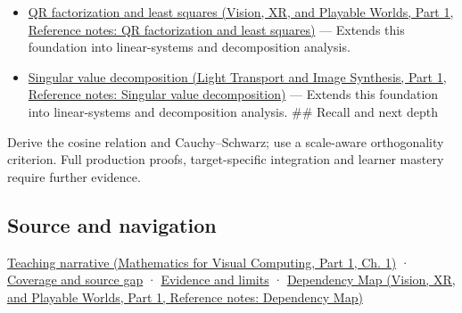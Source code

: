\begin{itemize}
\item
  \href{../07-Vision-XR-and-Playable-Worlds-P01/main.pdf\#nameddest=appendix-c3421e6b4f2c}{QR factorization and least squares (Vision, XR, and Playable Worlds, Part 1, Reference notes: QR factorization and least squares)} --- Extends this foundation into linear-systems and decomposition analysis.
\item
  \href{../04-Light-Transport-and-Image-Synthesis-P01/main.pdf\#nameddest=appendix-1fad5e7f36fa}{Singular value decomposition (Light Transport and Image Synthesis, Part 1, Reference notes: Singular value decomposition)} --- Extends this foundation into linear-systems and decomposition analysis. \#\# Recall and next depth
\end{itemize}

Derive the cosine relation and Cauchy--Schwarz; use a scale-aware orthogonality criterion. Full production proofs, target-specific integration and learner mastery require further evidence.

\subsection{Source and navigation}\label{appendix-8bc4e8fc547c-source-and-navigation}

\hypertarget{appendix-8bc4e8fc547c-source-and-navigation}{}

\href{../02-Mathematics-for-Visual-Computing-P01/main.pdf\#nameddest=01-foundations-i-ch017-the-dot-product-turns-two-movements-into-a-measurement}{Teaching narrative (Mathematics for Visual Computing, Part 1, Ch. 1)} · \hyperref[appendix-fd090d982a15-phase-6---parts-501-600]{Coverage and source gap} · \hyperref[appendix-a103e7846d21-phase-6---source-analysis-and-verification]{Evidence and limits} · \href{../07-Vision-XR-and-Playable-Worlds-P01/main.pdf\#nameddest=appendix-4ad47bdd269a}{Dependency Map (Vision, XR, and Playable Worlds, Part 1, Reference notes: Dependency Map)}

